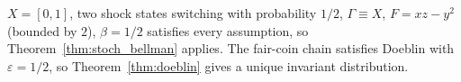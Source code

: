 \begin{remark}
\label{rem:stoch_example}
\leanok
{}
$X = [0, 1]$, two shock states switching with probability $1/2$, $\Gamma \equiv X$, $F = x z - y^2$ (bounded by $2$),
$\beta = 1/2$ satisfies every assumption, so Theorem~\ref{thm:stoch_bellman} applies. The fair-coin chain satisfies
Doeblin with $\varepsilon = 1/2$, so Theorem~\ref{thm:doeblin} gives a unique invariant distribution.
\end{remark}
